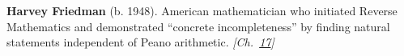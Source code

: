 \textbf{Harvey Friedman} (b. 1948). American mathematician who initiated Reverse Mathematics and demonstrated ``concrete incompleteness'' by finding natural statements independent of Peano arithmetic. \emph{[Ch.~\hyperref[ch:bignumbers]{17}]}

